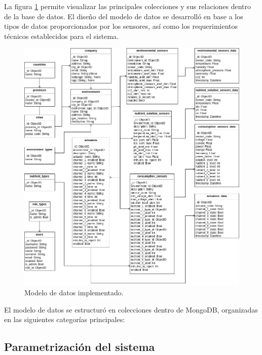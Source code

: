
La figura \ref{fig:modelo de datos} permite visualizar las principales
colecciones y sus relaciones dentro de la base de datos. El diseño del modelo
de datos se desarrolló en base a los tipos de datos proporcionados por los
sensores, así como los requerimientos técnicos establecidos para el sistema.

\begin{figure}[H]
    \centering
    \includegraphics[width=.99\textwidth]{./Images/15.png}
    \caption{Modelo de datos implementado.}
    \label{fig:modelo de datos}
\end{figure}

El modelo de datos se estructuró en colecciones dentro de MongoDB, organizadas
en las siguientes categorías principales:

\subsection{Parametrización del sistema}

